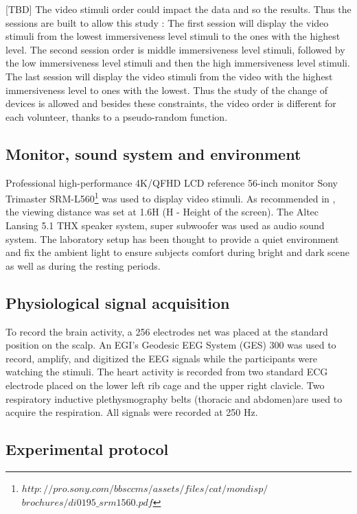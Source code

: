[TBD]
The video stimuli order could impact the data and so the results. Thus the sessions are built to allow this study : The first session will display the video stimuli from the lowest immersiveness level stimuli to the ones with the highest level. The second session order is middle immersiveness level stimuli, followed by the low immersiveness level stimuli and then the high immersiveness level stimuli. The last session will display the video stimuli from the video with the highest immersiveness level to ones with the lowest.
Thus the study of the change of devices is allowed and besides these constraints, the video order is different for each volunteer, thanks to a pseudo-random function. 

\subsection{Monitor, sound system and environment}

Professional high-performance 4K/QFHD LCD reference 56-inch monitor Sony Trimaster SRM-L560\footnote{$http://pro.sony.com/bbsccms/assets/files/cat/mondisp/$ \newline $brochures/di0195\_srm1560.pdf$} was used to display video stimuli.
As recommended in \cite{ScreenD}, the viewing distance was set at 1.6H (H - Height of the screen).
The Altec Lansing 5.1 THX speaker system, super subwoofer was used as audio sound system.
The laboratory setup has been thought to provide a quiet environment and fix the ambient light to ensure subjects comfort during bright and dark scene as well as during the resting periods. 

\subsection{Physiological signal acquisition}

To record the brain activity, a 256 electrodes net was placed at the standard position on the scalp. An EGI's Geodesic EEG System (GES) 300 was used to record, amplify, and digitized the EEG signals while the participants were watching the stimuli. The heart activity is recorded from two standard \ac{ECG} electrode placed on the lower left rib cage and the upper right clavicle. Two respiratory inductive plethysmography belts (thoracic and abdomen)are used to acquire the respiration. All signals were recorded at 250 Hz.

\subsection{Experimental protocol}

